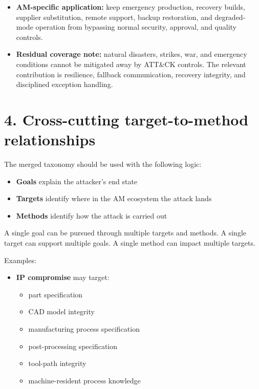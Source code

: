 \documentclass[10pt,a4paper,oneside]{report}
\begin{document}
\begin{itemize}
\item \textbf{AM-specific application:} keep emergency production, recovery builds, supplier substitution, remote support, backup restoration, and degraded-mode operation from bypassing normal security, approval, and quality controls.
\end{itemize}

\begin{itemize}
\item \textbf{Residual coverage note:} natural disasters, strikes, war, and emergency conditions cannot be mitigated away by ATT\&CK controls. The relevant contribution is resilience, fallback communication, recovery integrity, and disciplined exception handling.
\end{itemize}


\chapter{4. Cross-cutting target-to-method relationships}


The merged taxonomy should be used with the following logic:

\begin{itemize}
\item \textbf{Goals} explain the attacker's end state
\item \textbf{Targets} identify where in the AM ecosystem the attack lands
\item \textbf{Methods} identify how the attack is carried out
\end{itemize}

A single goal can be pursued through multiple targets and methods.
A single target can support multiple goals.
A single method can impact multiple targets.

Examples:

\begin{itemize}
\item \textbf{IP compromise} may target:
\begin{itemize}
\item part specification
\item CAD model integrity
\item manufacturing process specification
\item post-processing specification
\item tool-path integrity
\item machine-resident process knowledge
\end{itemize}
\end{itemize}
\end{document}
